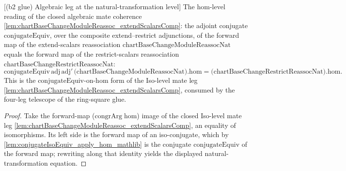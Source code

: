 \begin{lemma}

[(b2 glue) Algebraic leg at the natural-transformation level]
  \label{lem:ring_square_glue_alg_leg_nat}
  The hom-level reading of the closed algebraic mate coherence
  \cref{lem:chartBaseChangeModuleReassoc_extendScalarsComp}: the adjoint conjugate
  \(\mathrm{conjugateEquiv}\), over the composite extend--restrict adjunctions, of the forward map of
  the extend-scalars reassociation \(\mathrm{chartBaseChangeModuleReassocNat}\) equals the forward map
  of the restrict-scalars reassociation \(\mathrm{chartBaseChangeRestrictReassocNat}\):
  \[
    \mathrm{conjugateEquiv}\,\mathrm{adj}\,\mathrm{adj}'\,
      \bigl(\mathrm{chartBaseChangeModuleReassocNat}\bigr).\mathrm{hom}
      = \bigl(\mathrm{chartBaseChangeRestrictReassocNat}\bigr).\mathrm{hom}.
  \]
  This is the \(\mathrm{conjugateEquiv}\)-on-\(\mathrm{hom}\) form of the Iso-level mate leg
  \cref{lem:chartBaseChangeModuleReassoc_extendScalarsComp}, consumed by the four-leg telescope of the
  ring-square glue.
  \begin{proof}
    Take the forward-map (\(\mathrm{congrArg}\;\mathrm{hom}\)) image of the closed Iso-level mate leg
    \cref{lem:chartBaseChangeModuleReassoc_extendScalarsComp}, an equality of isomorphisms. Its left
    side is the forward map of an iso-conjugate, which by
    \cref{lem:conjugateIsoEquiv_apply_hom_mathlib} is the conjugate \(\mathrm{conjugateEquiv}\) of the
    forward map; rewriting along that identity yields the displayed natural-transformation equation.
  \end{proof}
\end{lemma}

